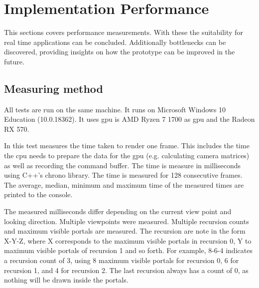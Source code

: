 \section{Implementation Performance}
\label{section:performancemeasurement}

This sections covers performance measurements. With these the suitability for real time applications can be concluded. Additionally bottlenecks can be discovered, providing insights on how the prototype can be improved in the future.

\subsection{Measuring method}
All tests are run on the same machine. It runs on Microsoft Windows 10 Education (10.0.18362). It uses \gls{gpu} is AMD Ryzen 7 1700 as \gls{gpu} and the Radeon RX 570.

In this test measures the time taken to render one frame. This includes the time the \gls{cpu} needs to prepare the data for the \gls{gpu} (e.g. calculating camera matrices) as well as recording the command buffer. The time is measure in milliseconds using C++'s chrono library. The time is measured for 128 consecutive frames. The average, median, minimum and maximum time of the measured times are printed to the console.


The measured milliseconds differ depending on the current view point and looking direction. Multiple viewpoints were measured. Multiple recursion counts and maximum visible portals are measured. The recursion are note in the form  X-Y-Z, where X corresponds to the maximum visible portals in recursion 0, Y to maximum visible portals of recursion 1 and so forth. For example, 8-6-4 indicates a recursion count of 3, using 8 maximum visible portals for recursion 0, 6 for recursion 1, and 4 for recursion 2. The last recursion always has a count of 0, as nothing will be drawn inside the portals. 

